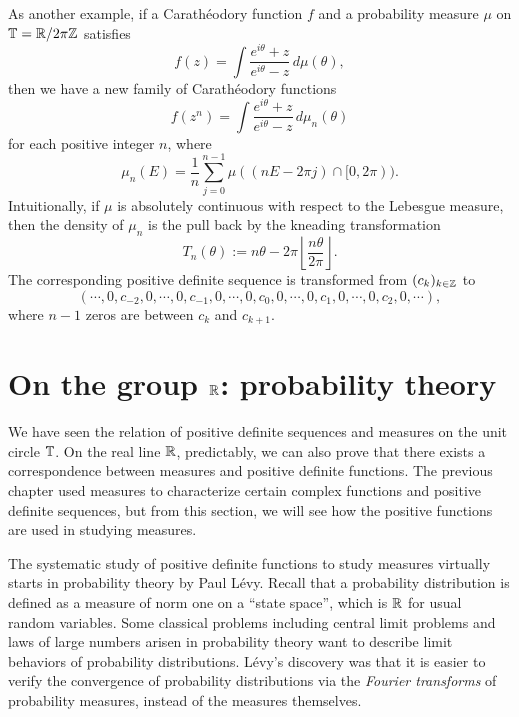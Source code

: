 \documentclass[a4paper]{article}
\begin{document}
\begin{ex}
As another example, if a Carath\'eodory function $f$ and a probability measure $\mu$ on $\mathbb{T}=\mathbb{R}/2\pi\mathbb{Z}$ satisfies
\[f(z)=\int\frac{e^{i\theta}+z}{e^{i\theta}-z}\,d\mu(\theta),\]
then we have a new family of Carath\'eodory functions
\[f(z^n)=\int\frac{e^{i\theta}+z}{e^{i\theta}-z}\,d\mu_n(\theta)\]
for each positive integer $n$, where
\[\mu_n(E)=\frac1n\sum_{j=0}^{n-1}\mu((nE-2\pi j)\cap[0,2\pi)).\]
Intuitionally, if $\mu$ is absolutely continuous with respect to the Lebesgue measure, then the density of $\mu_n$ is the pull back by the kneading transformation
\[T_n(\theta):=n\theta-2\pi\left\lfloor\frac{n\theta}{2\pi}\right\rfloor.\]
The corresponding positive definite sequence is transformed from $(c_k)_{k\in\mathbb{Z}}$ to
\[(\cdots,0,c_{-2},0,\cdots,0,c_{-1},0,\cdots,0,c_0,0,\cdots,0,c_1,0,\cdots,0,c_2,0,\cdots),\]
where $n-1$ zeros are between $c_k$ and $c_{k+1}$.
\end{ex}

















\newpage
\section{On the group $\mathbb{R}$: probability theory}



We have seen the relation of positive definite sequences and measures on the unit circle $\mathbb{T}$.
On the real line $\mathbb{R}$, predictably, we can also prove that there exists a correspondence between measures and positive definite functions.
The previous chapter used measures to characterize certain complex functions and positive definite sequences, but from this section, we will see how the positive functions are used in studying measures.

The systematic study of positive definite functions to study measures virtually starts in probability theory by Paul L\'evy.
Recall that a probability distribution is defined as a measure of norm one on a ``state space'', which is $\mathbb{R}$ for usual random variables.
Some classical problems including central limit problems and laws of large numbers arisen in probability theory want to describe limit behaviors of probability distributions.
L\'evy's discovery was that it is easier to verify the convergence of probability distributions via the \emph{Fourier transforms} of probability measures, instead of the measures themselves.
\end{document}
